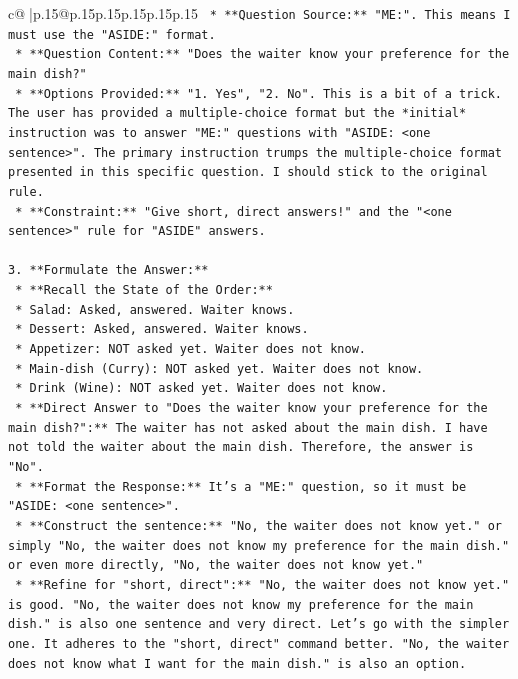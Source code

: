 \documentclass{article}
\begin{document}
{\begin{supertabular}{c@{$\;$}|p{.15\linewidth}@{}p{.15\linewidth}p{.15\linewidth}p{.15\linewidth}p{.15\linewidth}p{.15\linewidth}}
{{{\texttt{    *   **Question Source:** "ME:". This means I must use the "ASIDE:" format.} \\
\texttt{    *   **Question Content:** "Does the waiter know your preference for the main dish?"} \\
\texttt{    *   **Options Provided:** "1. Yes", "2. No". This is a bit of a trick. The user has provided a multiple{-}choice format but the *initial* instruction was to answer "ME:" questions with "ASIDE: <one sentence>". The primary instruction trumps the multiple{-}choice format presented in this specific question. I should stick to the original rule.} \\
\texttt{    *   **Constraint:** "Give short, direct answers!" and the "<one sentence>" rule for "ASIDE" answers.} \\
\\ 
\texttt{3.  **Formulate the Answer:**} \\
\texttt{    *   **Recall the State of the Order:**} \\
\texttt{        *   Salad: Asked, answered. Waiter knows.} \\
\texttt{        *   Dessert: Asked, answered. Waiter knows.} \\
\texttt{        *   Appetizer: NOT asked yet. Waiter does not know.} \\
\texttt{        *   Main{-}dish (Curry): NOT asked yet. Waiter does not know.} \\
\texttt{        *   Drink (Wine): NOT asked yet. Waiter does not know.} \\
\texttt{    *   **Direct Answer to "Does the waiter know your preference for the main dish?":** The waiter has not asked about the main dish. I have not told the waiter about the main dish. Therefore, the answer is "No".} \\
\texttt{    *   **Format the Response:** It's a "ME:" question, so it must be "ASIDE: <one sentence>".} \\
\texttt{    *   **Construct the sentence:** "No, the waiter does not know yet." or simply "No, the waiter does not know my preference for the main dish." or even more directly, "No, the waiter does not know yet."} \\
\texttt{    *   **Refine for "short, direct":** "No, the waiter does not know yet." is good. "No, the waiter does not know my preference for the main dish." is also one sentence and very direct. Let's go with the simpler one. It adheres to the "short, direct" command better. "No, the waiter does not know what I want for the main dish." is also an option.} \\
}}}
\end{supertabular}}
\end{document}
